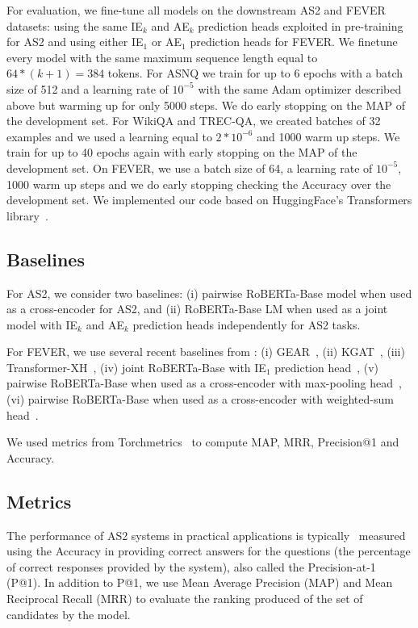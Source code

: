 For evaluation, we fine-tune all models on the downstream AS2 and FEVER datasets: using the same IE$_k$ and AE$_k$ prediction heads exploited in pre-training for AS2 and using either IE$_1$ or AE$_1$ prediction heads for FEVER. We finetune every model with the same maximum sequence length equal to $64 * (k+1) = 384$ tokens. For ASNQ we train for up to 6 epochs with a batch size of 512 and a learning rate of $10^{-5}$ with the same Adam optimizer described above but warming up for only 5000 steps. We do early stopping on the MAP of the development set. For WikiQA and TREC-QA, we created batches of 32 examples and we used a learning equal to $2*10^{-6}$ and 1000 warm up steps. We train for up to 40 epochs again with early stopping on the MAP of the development set. On FEVER, we use a batch size of 64, a learning rate of $10^{-5}$, 1000 warm up steps and we do early stopping checking the Accuracy over the development set. We implemented our code based on HuggingFace's Transformers library~\cite{wolf-etal-2020-transformers}.

\subsection{Baselines}
For AS2, we consider two baselines: (i) pairwise RoBERTa-Base model when used as a cross-encoder for AS2, and (ii) RoBERTa-Base LM when used as a joint model with IE$_k$ and AE$_k$ prediction heads independently for AS2 tasks.

For FEVER, we use several recent baselines from \citeauthor{tymoshenko-moschitti-2021-strong}: (i) GEAR~\cite{zhou-etal-2019-gear}, (ii) KGAT~\cite{liu2020kernel}, (iii) Transformer-XH~\cite{zhao2020transformer-xh}, (iv) joint RoBERTa-Base with IE$_1$ prediction head~\cite{tymoshenko-moschitti-2021-strong}, (v) pairwise RoBERTa-Base when used as a cross-encoder with max-pooling head~\cite{tymoshenko-moschitti-2021-strong}, (vi) pairwise RoBERTa-Base when used as a cross-encoder with weighted-sum head~\cite{tymoshenko-moschitti-2021-strong}.

We used metrics from Torchmetrics~\cite{torchmetrics} to compute MAP, MRR, Precision@1 and Accuracy.


\subsection{Metrics}

The performance of AS2 systems in practical applications is typically~\cite{garg-moschitti-2021-will} measured using the Accuracy in providing correct answers for the questions (the percentage of correct responses provided by the system), also called the Precision-at-1 (P@1). In addition to P@1, we use Mean Average Precision (MAP) and Mean Reciprocal Recall (MRR) to evaluate the ranking produced of the set of candidates by the model.

